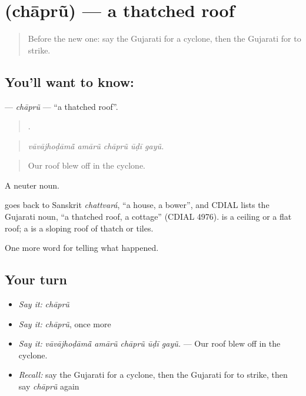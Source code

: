 \section[\texorpdfstring{\gu{છાપરું} (chāprũ)}{છાપરું (chāprũ)}]{ (chāprũ) — a thatched roof}

\label{lesson:GU-C303-chapru}



\begin{quote}
Before the new one: say the Gujarati for a cyclone, then the Gujarati for to strike.
\end{quote}

\subsection*{You'll want to know: }
\textbf{} — \emph{chāprũ} — \textquotedblleft{}a thatched roof\textquotedblright{}.

\begin{quote}
    .
\end{quote}

\begin{quote}
\emph{vāvājhoḍāmā̃ amārũ chāprũ ūḍī gayũ.}
\end{quote}

\begin{quote}
Our roof blew off in the cyclone.
\end{quote}

A neuter noun.

\begin{cousinweb}
goes back to Sanskrit \emph{chattvará}, \textquotedblleft{}a house, a bower\textquotedblright{}, and CDIAL lists the Gujarati noun, \textquotedblleft{}a thatched roof, a cottage\textquotedblright{} (CDIAL 4976). \textbf{} is a ceiling or a flat roof; a \textbf{} is a sloping roof of thatch or tiles.
\end{cousinweb}

\begin{grammarlens}[title={What you've built}]
One more word for telling what happened.
\end{grammarlens}

\subsection*{Your turn}
\begin{itemize}
\raggedright
  \item \emph{Say it:} \emph{chāprũ}
  \item \emph{Say it:} \emph{chāprũ}, once more
  \item \emph{Say it:} \emph{vāvājhoḍāmā̃ amārũ chāprũ ūḍī gayũ.} — Our roof blew off in the cyclone.
  \item \emph{Recall:} say the Gujarati for a cyclone, then the Gujarati for to strike, then say \emph{chāprũ} again
\end{itemize}

